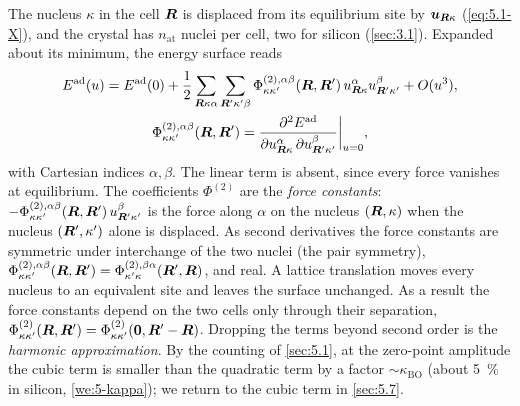 The nucleus $\kappa$ in the cell $\bm{R}$ is displaced from its equilibrium site by $\bm{u}_{\bm{R}\kappa}$ (\cref{eq:5.1-X}), and the crystal has $n_{\mathrm{at}}$ nuclei per cell, two for silicon (\cref{sec:3.1}). Expanded about its minimum, the energy surface reads
\begin{equation}
  \begin{gathered}
  E^{\mathrm{ad}}(u) = E^{\mathrm{ad}}(0) + \frac12\sum_{\bm{R}\kappa\alpha}\sum_{\bm{R}'\kappa'\beta}\Phi^{(2),\alpha\beta}_{\kappa\kappa'}(\bm{R},\bm{R}')\,u^\alpha_{\bm{R}\kappa}u^\beta_{\bm{R}'\kappa'} + O(u^3) ,
  \\
  \Phi^{(2),\alpha\beta}_{\kappa\kappa'}(\bm{R},\bm{R}') = \frac{\partial^2E^{\mathrm{ad}}}{\partial u^\alpha_{\bm{R}\kappa}\,\partial u^\beta_{\bm{R}'\kappa'}}\bigg|_{u=0} ,
  \end{gathered}
  \label{eq:5.2-expand}
\end{equation}
with Cartesian indices $\alpha, \beta$. The linear term is absent, since every force vanishes at equilibrium. The coefficients $\Phi^{(2)}$ are the \emph{force constants}: $-\Phi^{(2),\alpha\beta}_{\kappa\kappa'}(\bm{R},\bm{R}')\,u^\beta_{\bm{R}'\kappa'}$ is the force along $\alpha$ on the nucleus $(\bm{R},\kappa)$ when the nucleus $(\bm{R}',\kappa')$ alone is displaced. As second derivatives the force constants are symmetric under interchange of the two nuclei (the pair symmetry), $\Phi^{(2),\alpha\beta}_{\kappa\kappa'}(\bm{R},\bm{R}') = \Phi^{(2),\beta\alpha}_{\kappa'\kappa}(\bm{R}',\bm{R})$, and real. A lattice translation moves every nucleus to an equivalent site and leaves the surface unchanged. As a result the force constants depend on the two cells only through their separation, $\Phi^{(2)}_{\kappa\kappa'}(\bm{R},\bm{R}') = \Phi^{(2)}_{\kappa\kappa'}(\bm{0},\bm{R}'-\bm{R})$. Dropping the terms beyond second order is the \emph{harmonic approximation}. By the counting of \cref{sec:5.1}, at the zero-point amplitude the cubic term is smaller than the quadratic term by a factor $\sim\kappa_{\mathrm{BO}}$ (about \SI{5}{\percent} in silicon, \cref{we:5-kappa}); we return to the cubic term in \cref{sec:5.7}.

